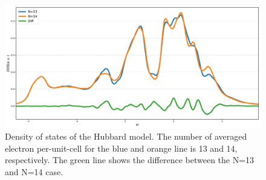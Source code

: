 \documentclass[aps,prl,twocolumn,superscriptaddress]{revtex4}
\begin{document}
\begin{figure}
    \includegraphics[width=\columnwidth]{ComposedDOS.pdf}
    \caption{\label{ComposedDOS}Density of states of the Hubbard model. The number of averaged electron per-unit-cell for the blue and orange line is 13 and 14, respectively. The green line shows the difference between the N=13 and N=14 case.}
\end{figure}


\end{document}
